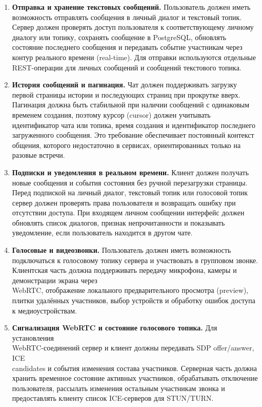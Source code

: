 \documentclass[a4paper,12pt]{extarticle}
\begin{document}
\begin{enumerate}
    \item [F-6] \textbf{Отправка и хранение текстовых сообщений.} Пользователь должен иметь возможность отправлять сообщения в личный диалог и текстовый топик. Сервер должен проверять доступ пользователя к соответствующему личному диалогу или топику, сохранять сообщение в PostgreSQL, обновлять состояние последнего сообщения и передавать событие участникам через контур реального времени (real-time). Для отправки используются отдельные REST-операции для личных сообщений и сообщений текстового топика.

    \item [F-7] \textbf{История сообщений и пагинация.} Чат должен поддерживать загрузку первой страницы истории и последующих страниц при прокрутке вверх. Пагинация должна быть стабильной при наличии сообщений с одинаковым временем создания, поэтому курсор (cursor) должен учитывать идентификатор чата или топика, время создания и идентификатор последнего загруженного сообщения. Это требование обеспечивает постоянный контекст общения, которого недостаточно в сервисах, ориентированных только на разовые встречи.

    \item [F-8] \textbf{Подписки и уведомления в реальном времени.} Клиент должен получать новые сообщения и события состояния без ручной перезагрузки страницы. Перед подпиской на личный диалог, текстовый топик или голосовой топик сервер должен проверять права пользователя и возвращать ошибку при отсутствии доступа. При входящем личном сообщении интерфейс должен обновлять список диалогов, признак непрочитанности и показывать уведомление, если пользователь находится в другом чате.

    \item [F-9] \textbf{Голосовые и видеозвонки.} Пользователь должен иметь возможность подключаться к голосовому топику сервера и участвовать в групповом звонке. Клиентская часть должна поддерживать передачу микрофона, камеры и демонстрации экрана через\\WebRTC, отображение локального предварительного просмотра (preview), плитки удалённых участников, выбор устройств и обработку ошибок доступа к медиоустройствам.

    \item [F-10] \textbf{Сигнализация WebRTC и состояние голосового топика.} Для установления \\WebRTC-соединений сервер и клиент должны передавать SDP offer/answer, ICE\\candidates и события изменения состава участников. Серверная часть должна хранить временное состояние активных участников, обрабатывать отключение пользователя, рассылать изменения остальным участникам звонка и предоставлять клиенту список ICE-серверов для STUN/TURN.


\end{enumerate}
\end{document}
